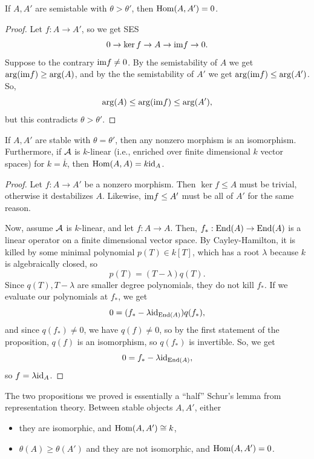 \documentclass[12pt]{article}
\begin{document}
\begin{prop}
    If $A,A'$ are semistable with $\theta > \theta'$, then $\mathrm{Hom}(A,A')=0$.
\end{prop}
\begin{proof}
    Let $f:A\to A'$, so we get SES
    \[0 \to \ker f \to A \to \mathrm{im} f \to 0.\]
    Suppose to the contrary $\mathrm{im} f\neq 0$. By the semistability of $A$ we get $\arg(\mathrm{im} f) \geq \arg(A)$, and by the the semistability of $A'$ we get $\arg(\mathrm{im} f) \leq \arg(A')$. So,
    \[\arg(A) \leq \arg(\mathrm{im} f) \leq \arg(A'),\]
    but this contradicts $\theta > \theta'$.
\end{proof}

\begin{prop}
    If $A,A'$ are stable with $\theta=\theta'$, then any nonzero morphism is an isomorphism. Furthermore, if $\mathcal{A}$ is $k$-linear (i.e., enriched over finite dimensional $k$ vector spaces) for $k=\overline{k}$, then $\mathrm{Hom}(A,A)=k\mathrm{id}_A$.
\end{prop}

\begin{proof}
    Let $f:A\to A'$ be a nonzero morphism. Then $\ker f \leq A$ must be trivial, otherwise it destabilizes $A$. Likewise, $\mathrm{im} f \leq A'$ must be all of $A'$ for the same reason.

    Now, assume $\mathcal{A}$ is $k$-linear, and let $f: A\to A$. Then, $f_*: \operatorname{End}(A) \to \operatorname{End}(A)$ is a linear operator on a finite dimensional vector space. By Cayley-Hamilton, it is killed by some minimal polynomial $p(T) \in k[T]$, which has a root $\lambda$ because $k$ is algebraically closed, so 
    \[p(T) = (T-\lambda) q(T).\]
    Since $q(T),T-\lambda$ are smaller degree polynomials, they do not kill $f_*$. If we evaluate our polynomials at $f_*$, we get
    \[0 = (f_* - \lambda \mathrm{id}_{\operatorname{End}(A)}) q(f_*),\]
    and since $q(f_*)\neq 0$, we have $q(f)\neq 0$, so by the first statement of the proposition, $q(f)$ is an isomorphism, so $q(f_*)$ is invertible. So, we get
    \[0 = f_* - \lambda \mathrm{id}_{\operatorname{End}(A)},\]
    so $f = \lambda \mathrm{id}_A$.
\end{proof}

\begin{rmk}
    The two propositions we proved is essentially a ``half'' Schur's lemma from representation theory. Between stable objects $A,A'$, either
    \begin{itemize}
        \item they are isomorphic, and $\mathrm{Hom}(A,A')\cong k$,
        \item $\theta(A) \geq \theta(A')$ and they are not isomorphic, and $\mathrm{Hom}(A,A')=0$.
    \end{itemize}
\end{rmk}
\end{document}
